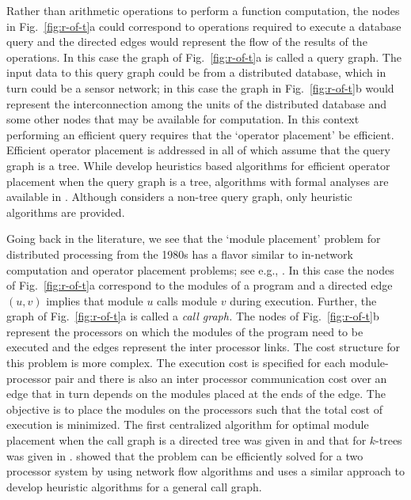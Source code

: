 \documentclass[journal]{IEEEtran}
\begin{document}
Rather than arithmetic operations to perform a function computation,
the nodes in Fig.~\ref{fig:r-of-t}a could correspond to operations
required to execute a database query and the directed edges would
represent the flow of the results of the operations. In this case the
graph of Fig.~\ref{fig:r-of-t}a is called a query graph. The input
data to this query graph could be from a distributed database, which
in turn could be a sensor network; in this case the graph in
Fig.~\ref{fig:r-of-t}b would represent the interconnection among the
units of the distributed database and some other nodes that may be
available for computation. In this context performing an efficient
query requires that the `operator placement' be efficient. Efficient
operator placement is addressed in
\cite{Bonfils04,Srivastsava05,Abrams05,Pietzuch06,Ying08,Wen13} all of
which assume that the query graph is a tree. While
\cite{Wen13,Pietzuch06,Bonfils04} develop heuristics based algorithms
for efficient operator placement when the query graph is a tree,
algorithms with formal analyses are available in
\cite{Srivastsava05,Abrams05,Ying08}. Although \cite{Phatak10}
considers a non-tree query graph, only heuristic algorithms are
provided.

Going back in the literature, we see that the `module placement'
problem for distributed processing from the 1980s has a flavor similar
to in-network computation and operator placement problems; see e.g.,
\cite{Stone77,Bokhari81,MaryLo88,Bokhari88,Fernandez-Baca89}. In this
case the nodes of Fig.~\ref{fig:r-of-t}a correspond to the modules of
a program and a directed edge $(u,v)$ implies that module $u$ calls
module $v$ during execution.  Further, the graph of
Fig.~\ref{fig:r-of-t}a is called a \textit{call graph.} The nodes of
Fig.~\ref{fig:r-of-t}b represent the processors on which the modules
of the program need to be executed and the edges represent the inter
processor links. The cost structure for this problem is more
complex. The execution cost is specified for each module-processor
pair and there is also an inter processor communication cost over an
edge that in turn depends on the modules placed at the ends of the
edge. The objective is to place the modules on the processors such
that the total cost of execution is minimized.  The first centralized
algorithm for optimal module placement when the call graph is a
directed tree was given in \cite{Bokhari81} and that for $k$-trees was
given in \cite{Fernandez-Baca89}. \cite{Stone77} showed that the
problem can be efficiently solved for a two processor system by using
network flow algorithms and \cite{MaryLo88} uses a similar approach to
develop heuristic algorithms for a general call graph.
\end{document}
